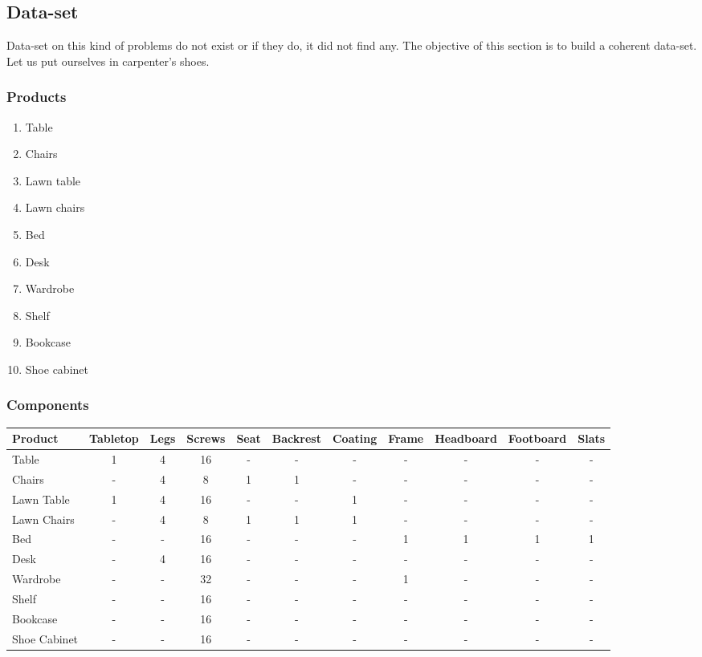 \documentclass{amsart}
\begin{document}
\subsection{Data-set}
Data-set on this kind of problems do not exist or if they do, it did not find any. The objective of this section is to build a coherent data-set. Let us put ourselves in carpenter's shoes.
\subsubsection{Products}
\begin{enumerate}
    \item Table
    \item Chairs
    \item Lawn table
    \item Lawn chairs
    \item Bed
    \item Desk
    \item Wardrobe
    \item Shelf
    \item Bookcase
    \item Shoe cabinet
\end{enumerate}
\subsubsection{Components}
\small
\begin{longtable}{| l | c | c | c | c | c | c | c | c | c | c |}
\hline
\textbf{Product} & \textbf{Tabletop} & \textbf{Legs} & \textbf{Screws} & \textbf{Seat} & \textbf{Backrest} & \textbf{Coating} & \textbf{Frame} & \textbf{Headboard} & \textbf{Footboard } & \textbf{Slats } \\ 
\hline
Table & 1 & 4 & 16 & - & - & - & - & - & - & - \\ 
\hline
Chairs & - & 4 & 8 & 1 & 1 & - & - & - & - & - \\ 
\hline
Lawn Table & 1 & 4 & 16 & - & - & 1 & - & - & - & - \\ 
\hline
Lawn Chairs & - & 4 & 8 & 1 & 1 & 1 & - & - & - & - \\ 
\hline
Bed & - & - & 16 & - & - & - & 1 & 1 & 1 & 1 \\ 
\hline
Desk & - & 4 & 16 & - & - & - & - & - & - & - \\ 
\hline
Wardrobe & - & - & 32 & - & - & - & 1 & - & - & - \\ 
\hline
Shelf & - & - & 16 & - & - & - & - & - & - & - \\ 
\hline
Bookcase & - & - & 16 & - & - & - & - & - & - & - \\ 
\hline
Shoe Cabinet & - & - & 16 & - & - & - & - & - & - & - \\ 
\hline
\end{longtable}
\end{document}
